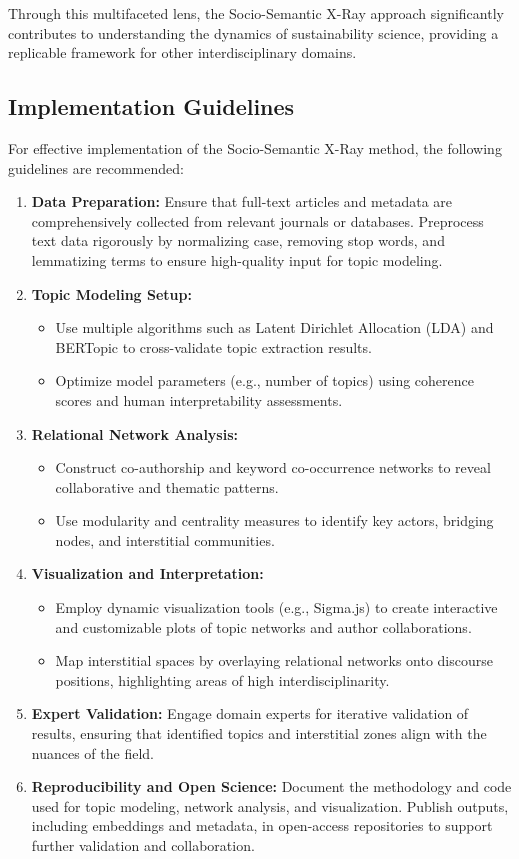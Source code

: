 \documentclass[12pt]{article}
\begin{document}
Through this multifaceted lens, the Socio-Semantic X-Ray approach significantly contributes to understanding the dynamics of sustainability science, providing a replicable framework for other interdisciplinary domains.

\subsection{Implementation Guidelines}
For effective implementation of the Socio-Semantic X-Ray method, the following guidelines are recommended:

\begin{enumerate}
    \item \textbf{Data Preparation:} Ensure that full-text articles and metadata are comprehensively collected from relevant journals or databases. Preprocess text data rigorously by normalizing case, removing stop words, and lemmatizing terms to ensure high-quality input for topic modeling.
    \item \textbf{Topic Modeling Setup:}
    \begin{itemize}
        \item Use multiple algorithms such as Latent Dirichlet Allocation (LDA) and BERTopic to cross-validate topic extraction results.
        \item Optimize model parameters (e.g., number of topics) using coherence scores and human interpretability assessments.
    \end{itemize}
    \item \textbf{Relational Network Analysis:}
    \begin{itemize}
        \item Construct co-authorship and keyword co-occurrence networks to reveal collaborative and thematic patterns.
        \item Use modularity and centrality measures to identify key actors, bridging nodes, and interstitial communities.
    \end{itemize}
    \item \textbf{Visualization and Interpretation:}
    \begin{itemize}
        \item Employ dynamic visualization tools (e.g., Sigma.js) to create interactive and customizable plots of topic networks and author collaborations.
        \item Map interstitial spaces by overlaying relational networks onto discourse positions, highlighting areas of high interdisciplinarity.
    \end{itemize}
    \item \textbf{Expert Validation:} Engage domain experts for iterative validation of results, ensuring that identified topics and interstitial zones align with the nuances of the field.
    \item \textbf{Reproducibility and Open Science:} Document the methodology and code used for topic modeling, network analysis, and visualization. Publish outputs, including embeddings and metadata, in open-access repositories to support further validation and collaboration.
\end{enumerate}
\end{document}
